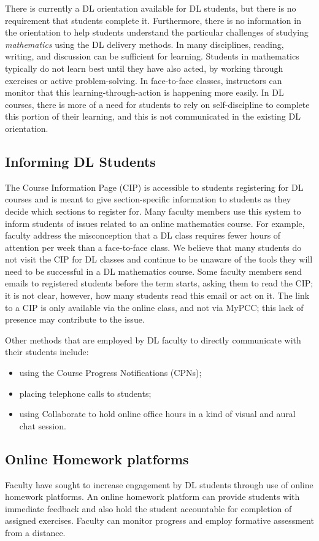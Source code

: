 There is currently a DL orientation available for DL students, but there is no
requirement that students complete it. Furthermore, there is no information in
the orientation to help students understand the particular challenges of
studying \emph{mathematics} using the DL delivery methods.  In many disciplines,
reading, writing, and discussion can be sufficient for learning. Students in
mathematics typically do not learn best until they have also acted, by working
through exercises or active problem-solving. In face-to-face classes,
instructors can monitor that this learning-through-action is happening more
easily. In DL courses, there is more of a need for students to rely on
self-discipline to complete this portion of their learning, and this is not
communicated in the existing DL orientation.


\subsection{Informing DL Students}
The Course Information Page (CIP) is accessible to students registering for DL
courses and is meant to give section-specific information to students as they
decide which sections to register for.   Many faculty members use this system to
inform students of issues related to an online mathematics course.  For example,
faculty address the misconception that a DL class requires fewer hours of
attention per week than a face-to-face class. We believe that many students do
not visit the CIP for DL classes and continue to be unaware of the tools they
will need to be successful in a DL mathematics course.   Some faculty members
send emails to registered students before the term starts, asking them to read
the CIP;  it is not clear, however, how many students read this email or act on
it.  The link to a CIP is only available via the online class, and not via
MyPCC; this lack of presence may contribute to the issue.

Other methods that are employed by DL faculty to directly communicate with their
students include:
\begin{itemize}
\item using the Course Progress Notifications (CPNs);
\item placing telephone calls to students;
\item using Collaborate to hold online office hours in a kind of visual and aural chat session.
\end{itemize}

\subsection{Online Homework platforms}
Faculty have sought to increase engagement by DL students through use of online
homework platforms. An online homework platform can provide students with
immediate feedback and also hold the student accountable for completion of
assigned exercises. Faculty can monitor progress and employ formative assessment
from a distance.

